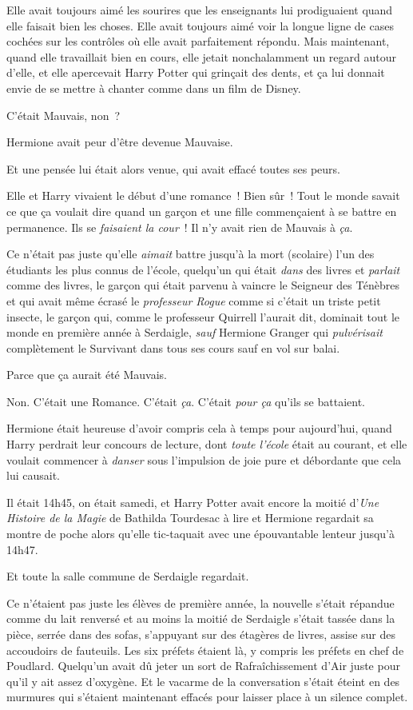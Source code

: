 Elle avait toujours aimé les sourires que les enseignants lui prodiguaient quand elle faisait bien les choses. Elle avait toujours aimé voir la longue ligne de cases cochées sur les contrôles où elle avait parfaitement répondu. Mais maintenant, quand elle travaillait bien en cours, elle jetait nonchalamment un regard autour d'elle, et elle apercevait Harry Potter qui grinçait des dents, et ça lui donnait envie de se mettre à chanter comme dans un film de Disney.

C'était Mauvais, non~?

Hermione avait peur d'être devenue Mauvaise.

Et une pensée lui était alors venue, qui avait effacé toutes ses peurs.

Elle et Harry vivaient le début d'une romance~! Bien sûr~! Tout le monde savait ce que ça voulait dire quand un garçon et une fille commençaient à se battre en permanence. Ils se \emph{faisaient la cour}~! Il n'y avait rien de Mauvais à \emph{ça}.

Ce n'était pas juste qu'elle \emph{aimait} battre jusqu'à la mort (scolaire) l'un des étudiants les plus connus de l'école, quelqu'un qui était \emph{dans} des livres et \emph{parlait} comme des livres, le garçon qui était parvenu à vaincre le Seigneur des Ténèbres et qui avait même écrasé le \emph{professeur Rogue} comme si c'était un triste petit insecte, le garçon qui, comme le professeur Quirrell l'aurait dit, dominait tout le monde en première année à Serdaigle, \emph{sauf} Hermione Granger qui \emph{pulvérisait} complètement le Survivant dans tous ses cours sauf en vol sur balai.

Parce que ça aurait été Mauvais.

Non. C'était une Romance. C'était \emph{ça}. C'était \emph{pour ça} qu'ils se battaient.

Hermione était heureuse d'avoir compris cela à temps pour aujourd'hui, quand Harry perdrait leur concours de lecture, dont \emph{toute l'école} était au courant, et elle voulait commencer à \emph{danser} sous l'impulsion de joie pure et débordante que cela lui causait.

Il était 14h45, on était samedi, et Harry Potter avait encore la moitié d'\emph{Une Histoire de la Magie} de Bathilda Tourdesac à lire et Hermione regardait sa montre de poche alors qu'elle tic-taquait avec une épouvantable lenteur jusqu'à 14h47.

Et toute la salle commune de Serdaigle regardait.

Ce n'étaient pas juste les élèves de première année, la nouvelle s'était répandue comme du lait renversé et au moins la moitié de Serdaigle s'était tassée dans la pièce, serrée dans des sofas, s'appuyant sur des étagères de livres, assise sur des accoudoirs de fauteuils. Les six préfets étaient là, y compris les préfets en chef de Poudlard. Quelqu'un avait dû jeter un sort de Rafraîchissement d'Air juste pour qu'il y ait assez d'oxygène. Et le vacarme de la conversation s'était éteint en des murmures qui s'étaient maintenant effacés pour laisser place à un silence complet.

